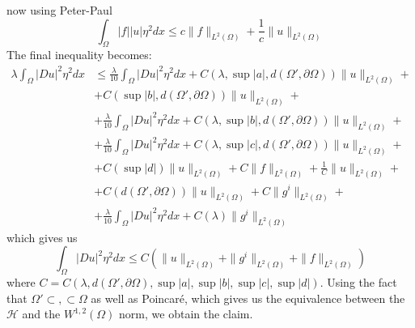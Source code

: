 \documentclass{article}
\begin{document}
now using Peter-Paul
\[
    \int_{\Omega} |f| |u| \eta^2 dx \leq c \|f\|_{L^2(\Omega)} + \frac{1}{c} \|u\|_{L^2(\Omega)}
\]
The final inequality becomes:
\[
    \begin{split}
        \lambda \int_{\Omega} |D u|^2 \eta^2 dx & \leq \frac{\lambda}{10} \int_{\Omega} |Du|^2 \eta^2 dx + C(\lambda, \sup{|a|}, d(\Omega', \partial \Omega))\|u\|_{L^2(\Omega)} + \\
        & + C( \sup{|b|}, d(\Omega', \partial \Omega))\|u\|_{L^2(\Omega)} + \\
        & + \frac{\lambda}{10} \int_{\Omega} |Du|^2 \eta^2 dx + C(\lambda, \sup{|b|}, d(\Omega', \partial \Omega))\|u\|_{L^2(\Omega)} + \\
        & + \frac{\lambda}{10} \int_{\Omega} |Du|^2 \eta^2 dx + C(\lambda, \sup{|c|}, d(\Omega', \partial \Omega))\|u\|_{L^2(\Omega)} + \\
        & + C(\sup{|d|})\|u\|_{L^2(\Omega)} + C \|f\|_{L^2(\Omega)} + \frac{1}{C} \|u\|_{L^2(\Omega)} + \\
        & + C(d(\Omega', \partial \Omega))\|u\|_{L^2(\Omega)} + C \|g^i\|_{L^2(\Omega)} +\\
        & + \frac{\lambda}{10} \int_{\Omega} |Du|^2 \eta^2 dx + C(\lambda)\|g^i\|_{L^2(\Omega)}
    \end{split}
\]
which gives us 
\[
    \int_{\Omega} |D u|^2 \eta^2 dx \leq C (\|u\|_{L^2(\Omega)} +  \|g^i\|_{L^2(\Omega)} + \|f\|_{L^2(\Omega)})
\]
where $C = C(\lambda, d(\Omega', \partial \Omega), \sup{|a|}, \sup{|b|}, \sup{|c|},\sup{|d|})$. Using the fact that $\Omega' \subset, \subset \Omega$ as well as Poincaré, which gives us the equivalence between the $\mathcal{H}$ and the $W^{1,2}(\Omega)$ norm, we obtain the claim.
\end{document}

